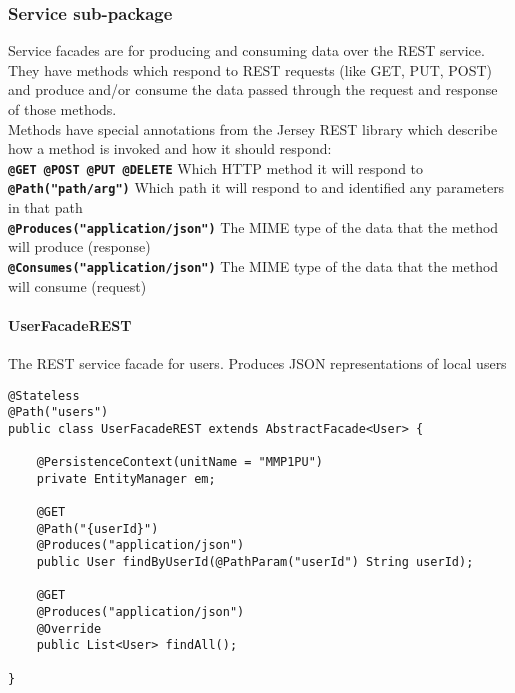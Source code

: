 \subsubsection{Service sub-package}
Service facades are for producing and consuming data over the REST service. They have methods which respond to REST requests (like GET, PUT, POST) and produce and/or consume the data passed through the request and response of those methods.
\\Methods have special annotations from the Jersey REST library which describe how a method is invoked and how it should respond:
\\\texttt{\textbf{@GET @POST @PUT @DELETE}} Which HTTP method it will respond to
\\\texttt{\textbf{@Path("path/{arg}")}} Which path it will respond to and identified any parameters in that path
\\\texttt{\textbf{@Produces("application/json")}} The MIME type of the data that the method will produce (response)
\\\texttt{\textbf{@Consumes("application/json")}} The MIME type of the data that the method will consume (request)

\paragraph{UserFacadeREST} The REST service facade for users. Produces JSON representations of local users
\begin{small}\begin{verbatim}
@Stateless
@Path("users")
public class UserFacadeREST extends AbstractFacade<User> {

    @PersistenceContext(unitName = "MMP1PU")
    private EntityManager em;

    @GET
    @Path("{userId}")
    @Produces("application/json")
    public User findByUserId(@PathParam("userId") String userId);

    @GET
    @Produces("application/json")
    @Override
    public List<User> findAll();

}
\end{verbatim}\end{small}


